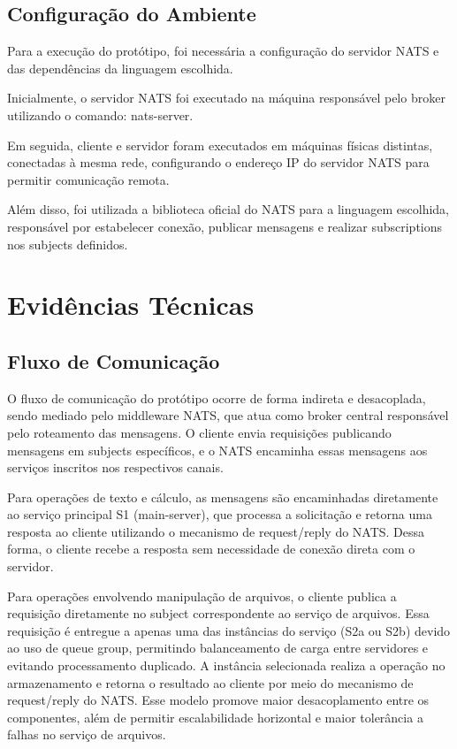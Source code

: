 \subsection{Configuração do Ambiente}

Para a execução do protótipo, foi necessária a configuração do servidor NATS e das dependências da linguagem escolhida.

Inicialmente, o servidor NATS foi executado na máquina responsável pelo broker utilizando o comando: nats-server.

Em seguida, cliente e servidor foram executados em máquinas físicas distintas, conectadas à mesma rede, configurando o endereço IP do servidor NATS para permitir comunicação remota.

Além disso, foi utilizada a biblioteca oficial do NATS para a linguagem escolhida, responsável por estabelecer conexão, publicar mensagens e realizar subscriptions nos subjects definidos.

\section{Evidências Técnicas}

\subsection{Fluxo de Comunicação}

O fluxo de comunicação do protótipo ocorre de forma indireta e desacoplada, sendo mediado pelo middleware NATS, que atua como broker central responsável pelo roteamento das mensagens. O cliente envia requisições publicando mensagens em subjects específicos, e o NATS encaminha essas mensagens aos serviços inscritos nos respectivos canais.

Para operações de texto e cálculo, as mensagens são encaminhadas diretamente ao serviço principal S1 (main-server), que processa a solicitação e retorna uma resposta ao cliente utilizando o mecanismo de request/reply do NATS. Dessa forma, o cliente recebe a resposta sem necessidade de conexão direta com o servidor.

Para operações envolvendo manipulação de arquivos, o cliente publica a requisição diretamente no subject correspondente ao serviço de arquivos. Essa requisição é entregue a apenas uma das instâncias do serviço (S2a ou S2b) devido ao uso de queue group, permitindo balanceamento de carga entre servidores e evitando processamento duplicado. A instância selecionada realiza a operação no armazenamento e retorna o resultado ao cliente por meio do mecanismo de request/reply do NATS. Esse modelo promove maior desacoplamento entre os componentes, além de permitir escalabilidade horizontal e maior tolerância a falhas no serviço de arquivos.

